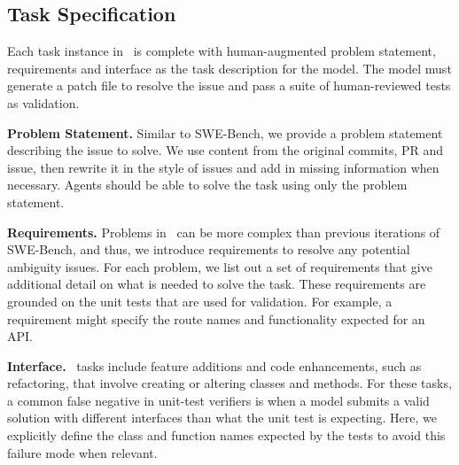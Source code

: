 \subsection{Task Specification}


Each task instance in \benchmarkname~is complete with human-augmented problem statement, requirements and interface as the task description for the model. The model must generate a patch file to resolve the issue and pass a suite of human-reviewed tests as validation.


\textbf{Problem Statement.} Similar to SWE-Bench, we provide a problem statement describing the issue to solve. We use content from the original commits, PR and issue, then rewrite it in the style of issues and add in missing information when necessary. Agents should be able to solve the task using only the problem statement.

\textbf{Requirements.} Problems in \benchmarkname~can be more complex than previous iterations of SWE-Bench, and thus, we introduce requirements to resolve any potential ambiguity issues. For each problem, we list out a set of requirements that give additional detail on what is needed to solve the task. These requirements are grounded on the unit tests that are used for validation. For example, a requirement might specify the route names and functionality expected for an API.

\textbf{Interface.}
\benchmarkname~tasks include feature additions and code enhancements, such as refactoring, that involve creating or altering classes and methods. For these tasks, a common false negative in unit-test verifiers is when a model submits a valid solution with different interfaces than what the unit test is expecting. Here, we explicitly define the class and function names expected by the tests to avoid this failure mode when relevant.


